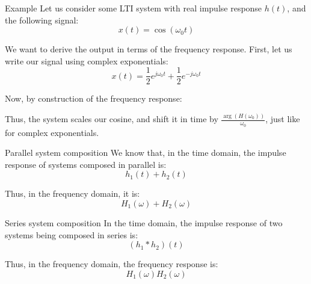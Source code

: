 \documentclass[a4paper]{article}
\begin{document}
\begin{parag}{Example}
    Let us consider some LTI system with real impulse response $h\left(t\right)$, and the following signal: 
    \[x\left(t\right) = \cos\left(\omega_0 t\right)\]
    
    We want to derive the output in terms of the frequency response. First, let us write our signal using complex exponentials: 
    \[x\left(t\right) = \frac{1}{2} e^{j \omega_0 t} + \frac{1}{2} e^{-j \omega_0 t}\]
    
    Now, by construction of the frequency response: 
    
    Thus, the system scales our cosine, and shift it in time by $\frac{\arg\left(H\left(\omega_0\right)\right)}{\omega_0}$, just like for complex exponentials.
\end{parag}

\begin{parag}{Parallel system composition}
    We know that, in the time domain, the impulse response of systems composed in parallel is: 
    \[h_1\left(t\right) + h_2\left(t\right)\]
    
    Thus, in the frequency domain, it is: 
    \[H_1\left(\omega\right) + H_2\left(\omega\right)\]
\end{parag}

\begin{parag}{Series system composition}
    In the time domain, the impulse response of two systems being composed in series is: 
    \[\left(h_1 * h_2\right)\left(t\right)\]
    
    Thus, in the frequency domain, the frequency response is: 
    \[H_1\left(\omega\right) H_2\left(\omega\right)\]
\end{parag}
\end{document}
